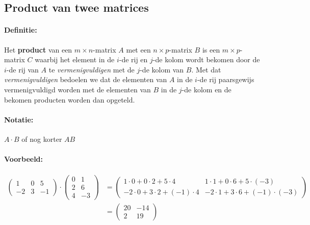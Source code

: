 \documentclass[12pt,twoside]{article}
\begin{document}
\subsection{Product van twee matrices}

\paragraph*{Definitie:} Het {\bf product} van een $m \times n$-matrix $A$ met een $n \times p$-matrix $B$ is een $m \times p$-matrix $C$ waarbij het element in de $i$-de rij en $j$-de kolom wordt bekomen door de $i$-de rij van $A$ te {\em vermenigvuldigen} met de $j$-de kolom van $B$. Met dat {\em vermenigvuldigen} bedoelen we dat de elementen van $A$ in de $i$-de rij paarsgewijs vermenigvuldigd worden met de elementen van $B$ in de $j$-de kolom en de bekomen producten worden dan opgeteld.

\paragraph*{Notatie:} $A \cdot B$ of nog korter $AB$

\paragraph*{Voorbeeld:}
\begin{align*}
  \begin{pmatrix}
    1 & 0 & 5\\
    -2 & 3 & -1
  \end{pmatrix}
    \cdot
  \begin{pmatrix}
    0 & 1\\
    2 & 6\\
    4 & -3
  \end{pmatrix}
    &=
  \begin{pmatrix}
    1 \cdot 0 + 0 \cdot 2 + 5 \cdot 4    & 1 \cdot 1 + 0 \cdot 6 + 5 \cdot (-3)\\
    -2 \cdot 0 + 3 \cdot 2 + (-1)\cdot 4 & -2 \cdot 1 + 3 \cdot 6 + (-1) \cdot (-3)
  \end{pmatrix}\\
    &=
  \begin{pmatrix}
    20 & -14\\
    2  & 19
  \end{pmatrix}
\end{align*}
\end{document}
